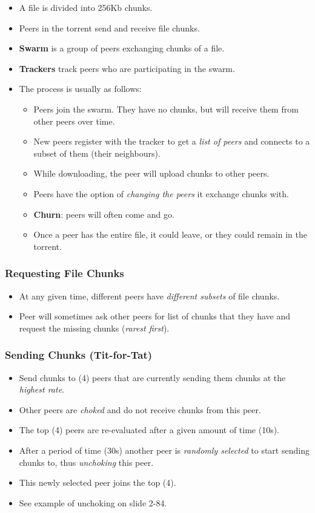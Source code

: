 \documentclass{article}
\begin{document}
\begin{itemize}
\item A file is divided into 256Kb chunks.
\item Peers in the torrent send and receive file chunks.
\item {\bf Swarm} is a group of peers exchanging chunks of a file.
\item {\bf Trackers} track peers who are participating in the swarm.
\item The process is usually as follows:
\begin{itemize}
\item Peers join the swarm. They have no chunks, but will receive them from other peers over time.
\item New peers register with the tracker to get a \emph{list of peers} and connects to a subset of them (their neighbours).
\item While downloading, the peer will upload chunks to other peers.
\item Peers have the option of \emph{changing the peers} it exchange chunks with.
\item {\bf Churn}: peers will often come and go.
\item Once a peer has the entire file, it could leave, or they could remain in the torrent.
\end{itemize}
\end{itemize}

\subsubsection{Requesting File Chunks}
\begin{itemize}
\item At any given time, different peers have \emph{different subsets} of file chunks.
\item Peer will sometimes ask other peers for list of chunks that they have and request the missing chunks (\emph{rarest first}).
\end{itemize}

\subsubsection{Sending Chunks (Tit-for-Tat)}
\begin{itemize}
\item Send chunks to (4) peers that are currently sending them chunks at the \emph{highest rate}.
\item Other peers are \emph{choked} and do not receive chunks from this peer.
\item The top (4) peers are re-evaluated after a given amount of time (10s).
\item After a period of time (30s) another peer is \emph{randomly selected} to start sending chunks to, thus \emph{unchoking} this peer.
\item This newly selected peer joins the top (4).
\item See example of unchoking on slide 2-84.
\end{itemize}
\end{document}
